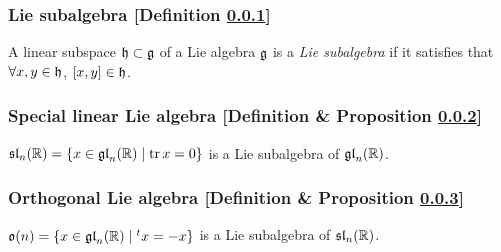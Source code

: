 \subsubsection{Lie subalgebra [Definition \ref{lie-subalgebra}]}\label{lie-subalgebra}
A linear subspace $\mathfrak{h} \subset \mathfrak{g}$ of a Lie algebra $\mathfrak{g}$ is a \textit{Lie subalgebra} if it satisfies that $\forall x, y \in \mathfrak{h}$, $[x,y] \in \mathfrak{h}$.

\subsubsection{Special linear Lie algebra [Definition \& Proposition \ref{special-linear-lie-algebra}]}\label{special-linear-lie-algebra}
$\mathfrak{sl}_n(\mathbb{R}) = \{ x \in \mathfrak{gl}_n(\mathbb{R}) \mid \mathrm{tr}\, x = 0 \} $ is a Lie subalgebra of $\mathfrak{gl}_n(\mathbb{R})$.

\subsubsection{Orthogonal Lie algebra [Definition \& Proposition \ref{orthogonal-lie-algebra}]}\label{orthogonal-lie-algebra}
$\mathfrak{o}(n) = \{ x \in \mathfrak{gl}_n(\mathbb{R}) \mid {}^tx = -x \}$ is a Lie subalgebra of $\mathfrak{sl}_n(\mathbb{R})$.

